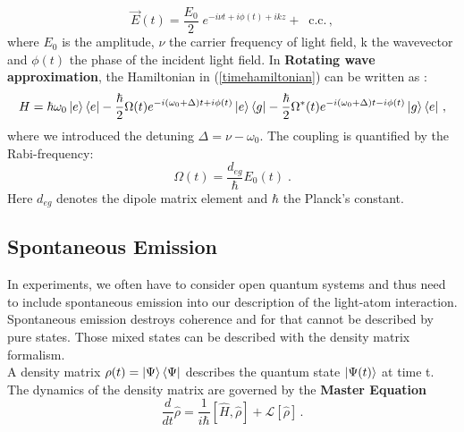 \begin{equation}
    \Vec{E}(t) = \frac{E_0}{2} \;  e^{-i\nu t + i \phi(t) + ikz} + \;\; \textrm{c.c.}\, ,
\end{equation}
where $E_0$ is the amplitude, $\nu $ the carrier frequency of light field, k the wavevector and $\phi(t)$ the phase of the incident light field. In \textbf{Rotating wave approximation}, the Hamiltonian in (\ref{timehamiltonian}) can be written as \cite{bloch2004licht}:
\begin{equation} \label{thehamiltonian}
    H = \hbar \omega_0 \ket{e} \bra{e} - \frac{\hbar}{2} \Omega(t) e^{-i(\omega_0 + \Delta)t + i\phi(t)} \ket{e}\bra{g}
    -\frac{\hbar}{2} \Omega^*(t) e^{-i(\omega_0 + \Delta)t - i\phi(t)} \ket{g}\bra{e} \, ,
\end{equation}
where we introduced the detuning $\Delta = \nu - \omega_0 $. The coupling is quantified by the Rabi-frequency:
\begin{equation}
    \Omega(t) = \frac{d_{eg}}{\hbar} E_0(t) \; . \label{rabi_omega}
\end{equation}
Here $d_{eg} $ denotes the dipole matrix element and $\hbar$ the Planck's constant. 


\subsection{Spontaneous Emission}
In experiments, we often have to consider open quantum systems and thus need to include spontaneous emission into our description of the light-atom interaction. Spontaneous emission destroys coherence and for that cannot be described by pure states. Those mixed states can be described with the density matrix formalism.\\

A density matrix $\rho(t)= \ket{\Psi} \bra{\Psi}$ describes the quantum state $\ket{\Psi(t)}$ at time t. The dynamics of the density matrix are governed by the \textbf{Master Equation}
\begin{equation} \label{master_eq}
    \frac{d}{dt} \hat{\rho} = \frac{1}{i\hbar} \left[\hat{H}, \hat{\rho}   \right] + \mathcal{L}[\hat{\rho}] \, .
\end{equation}

